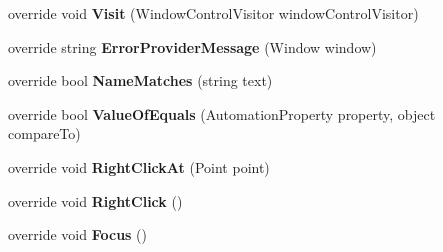 \begin{DoxyCompactItemize}
\item 
\hypertarget{class_proto_test_1_1_golem_1_1_white_1_1_elements_1_1_white_panel_a8fe2b8ed882e75df00f956329964050c}{override void {\bfseries Visit} (Window\-Control\-Visitor window\-Control\-Visitor)}\label{class_proto_test_1_1_golem_1_1_white_1_1_elements_1_1_white_panel_a8fe2b8ed882e75df00f956329964050c}

\item 
\hypertarget{class_proto_test_1_1_golem_1_1_white_1_1_elements_1_1_white_panel_ad0bdb6c14ef67449097e03e958da6fc8}{override string {\bfseries Error\-Provider\-Message} (Window window)}\label{class_proto_test_1_1_golem_1_1_white_1_1_elements_1_1_white_panel_ad0bdb6c14ef67449097e03e958da6fc8}

\item 
\hypertarget{class_proto_test_1_1_golem_1_1_white_1_1_elements_1_1_white_panel_a9d521dd6eaf2113201d3775f56738e1d}{override bool {\bfseries Name\-Matches} (string text)}\label{class_proto_test_1_1_golem_1_1_white_1_1_elements_1_1_white_panel_a9d521dd6eaf2113201d3775f56738e1d}

\item 
\hypertarget{class_proto_test_1_1_golem_1_1_white_1_1_elements_1_1_white_panel_a93f263cc1ad2ced94b9d724f94ff745f}{override bool {\bfseries Value\-Of\-Equals} (Automation\-Property property, object compare\-To)}\label{class_proto_test_1_1_golem_1_1_white_1_1_elements_1_1_white_panel_a93f263cc1ad2ced94b9d724f94ff745f}

\item 
\hypertarget{class_proto_test_1_1_golem_1_1_white_1_1_elements_1_1_white_panel_ae14e6ceb3bec090e214a5bb5947f5222}{override void {\bfseries Right\-Click\-At} (Point point)}\label{class_proto_test_1_1_golem_1_1_white_1_1_elements_1_1_white_panel_ae14e6ceb3bec090e214a5bb5947f5222}

\item 
\hypertarget{class_proto_test_1_1_golem_1_1_white_1_1_elements_1_1_white_panel_a5b330c3be17f9acf5194c873906ca293}{override void {\bfseries Right\-Click} ()}\label{class_proto_test_1_1_golem_1_1_white_1_1_elements_1_1_white_panel_a5b330c3be17f9acf5194c873906ca293}

\item 
\hypertarget{class_proto_test_1_1_golem_1_1_white_1_1_elements_1_1_white_panel_af22caf9ae8116dd057249ee76359caec}{override void {\bfseries Focus} ()}\label{class_proto_test_1_1_golem_1_1_white_1_1_elements_1_1_white_panel_af22caf9ae8116dd057249ee76359caec}


\end{DoxyCompactItemize}
